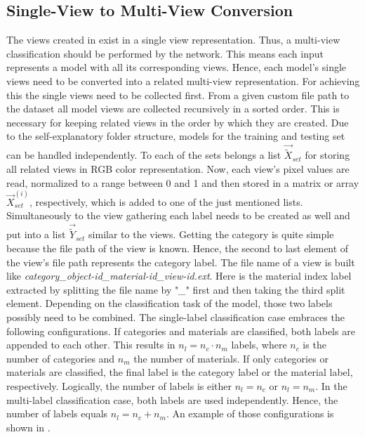 \subsection{Single-View to Multi-View Conversion}
\label{sec:prepare-data-view-conversion}
The views created in  exist in a single view representation.
Thus, a multi-view classification should be performed by the network.
This means each input represents a model with all its corresponding views.
Hence, each model's single views need to be converted into a related multi-view representation.
For achieving this the single views need to be collected first.
From a given custom file path to the dataset all model views are collected recursively in a sorted order.
This is necessary for keeping related views in the order by which they are created.
Due to the self-explanatory folder structure, models for the training and testing set can be handled independently.
To each of the sets belongs a list $\vec{\tilde{X}}_{set}$ for storing all related views in RGB color representation.
Now, each view's pixel values are read, normalized to a range between 0 and 1 and then stored in a matrix or array $\vec{X}_{set}^{(i)}$, respectively, which is added to one of the just mentioned lists.
Simultaneously to the view gathering each label needs to be created as well and put into a list $\vec{\tilde{Y}}_{set}$ similar to the views.
Getting the category is quite simple because the file path of the view is known.
Hence, the second to last element of the view's file path represents the category label.
The file name of a view is built like \textit{category\_object-id\_material-id\_view-id.ext}.
Here is the material index label extracted by splitting the file name by "\textit{\_}" first and then taking the third split element.
Depending on the classification task of the model, those two labels possibly need to be combined.
The single-label classification case embraces the following configurations.
If categories and materials are classified, both labels are appended to each other.
This results in $n_l = n_c \cdot n_m$ labels, where $n_c$ is the number of categories and $n_m$ the number of materials.
If only categories or materials are classified, the final label is the category label or the material label, respectively.
Logically, the number of labels is either $n_l = n_c$ or $n_l = n_m$.
In the multi-label classification case, both labels are used independently.
Hence, the number of labels equals $n_l = n_c + n_m$.
An example of those configurations is shown in .
